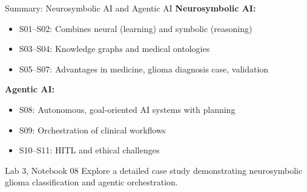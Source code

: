 \documentclass[aspectratio=169, 10pt]{beamer}
\begin{document}
\begin{frame}{Summary: Neurosymbolic AI and Agentic AI}
    \textbf{Neurosymbolic AI:}
    \begin{itemize}
        \item S01--S02: Combines neural (learning) and symbolic (reasoning)
        \item S03--S04: Knowledge graphs and medical ontologies
        \item S05--S07: Advantages in medicine, glioma diagnosis case, validation
    \end{itemize}
    
    \vspace{0.3cm}
    \textbf{Agentic AI:}
    \begin{itemize}
        \item S08: Autonomous, goal-oriented AI systems with planning
        \item S09: Orchestration of clinical workflows
        \item S10--S11: HITL and ethical challenges
    \end{itemize}
    
    \vspace{0.3cm}
    \begin{block}{Lab 3, Notebook 08}
        Explore a detailed case study demonstrating neurosymbolic glioma classification and agentic orchestration.
    \end{block}
\end{frame}
\end{document}
